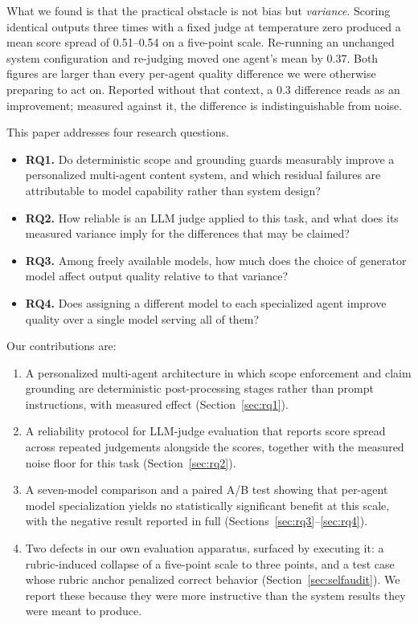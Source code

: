 \documentclass[journal]{IEEEtran}
\begin{document}
What we found is that the practical obstacle is not bias but \emph{variance}.
Scoring identical outputs three times with a fixed judge at temperature zero
produced a mean score spread of 0.51--0.54 on a five-point scale. Re-running an
unchanged system configuration and re-judging moved one agent's mean by 0.37.
Both figures are larger than every per-agent quality difference we were
otherwise preparing to act on. Reported without that context, a 0.3 difference
reads as an improvement; measured against it, the difference is
indistinguishable from noise.

This paper addresses four research questions.

\begin{itemize}
\item \textbf{RQ1.} Do deterministic scope and grounding guards measurably
      improve a personalized multi-agent content system, and which residual
      failures are attributable to model capability rather than system design?
\item \textbf{RQ2.} How reliable is an LLM judge applied to this task, and what
      does its measured variance imply for the differences that may be claimed?
\item \textbf{RQ3.} Among freely available models, how much does the choice of
      generator model affect output quality relative to that variance?
\item \textbf{RQ4.} Does assigning a different model to each specialized agent
      improve quality over a single model serving all of them?
\end{itemize}

Our contributions are:

\begin{enumerate}
\item A personalized multi-agent architecture in which scope enforcement and
      claim grounding are deterministic post-processing stages rather than
      prompt instructions, with measured effect (Section~\ref{sec:rq1}).
\item A reliability protocol for LLM-judge evaluation that reports score spread
      across repeated judgements alongside the scores, together with the
      measured noise floor for this task (Section~\ref{sec:rq2}).
\item A seven-model comparison and a paired A/B test showing that per-agent
      model specialization yields no statistically significant benefit at this
      scale, with the negative result reported in full
      (Sections~\ref{sec:rq3}--\ref{sec:rq4}).
\item Two defects in our own evaluation apparatus, surfaced by executing it: a
      rubric-induced collapse of a five-point scale to three points, and a test
      case whose rubric anchor penalized correct behavior
      (Section~\ref{sec:selfaudit}). We report these because they were more
      instructive than the system results they were meant to produce.
\end{enumerate}
\end{document}
